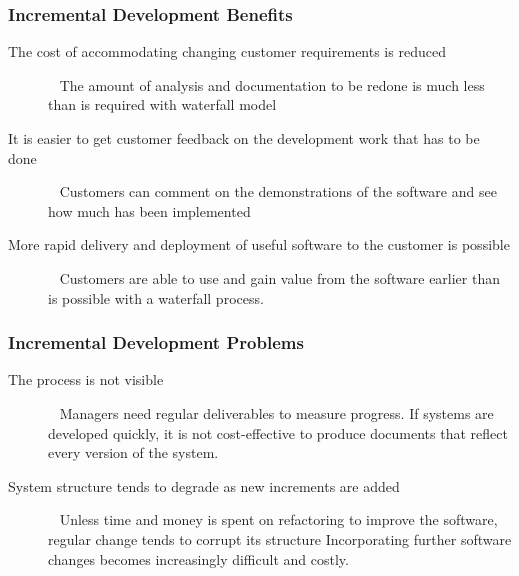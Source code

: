 \documentclass{report}
\begin{document}
\subsubsection{Incremental Development Benefits}
\begin{description}
  \item [The cost of accommodating changing customer requirements is reduced] \ \newline
  The amount of analysis and documentation to be redone is much less than is required with waterfall model
  \item [It is easier to get customer feedback on the development work that has to be done] \ \newline
  Customers can comment on the demonstrations of the software and see how much has been implemented
  \item [More rapid delivery and deployment of useful software to the customer is possible] \ \newline
  Customers are able to use and gain value from the software earlier than is possible with a waterfall process.
\end{description}


\subsubsection{Incremental Development Problems}
\begin{description}
  \item [The process is not visible] \ \newline
  Managers need regular deliverables to measure progress. If systems are developed quickly, it is not cost-effective to produce documents that reflect every version of the system.
  \item [System structure tends to degrade as new increments are added] \ \newline
  Unless time and money is spent on refactoring to improve the software, regular change tends to corrupt its structure\newline
  Incorporating further software changes becomes increasingly difficult and costly.
\end{description}
\end{document}

